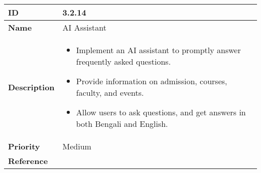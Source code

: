 \vspace{0.5cm}

\begin{center}
\begin{tabular}{ | >{\bfseries}m{5em} | m{10cm} |  } 
  \hline
  ID & 3.2.14\\  
  \hline
  Name & AI Assistant \\  
  \hline
  Description & 
  \begin{itemize}
      \item Implement an AI assistant to promptly answer frequently asked questions.
      \item Provide information on admission, courses, faculty, and events.
      \item Allow users to ask questions, and get answers in both Bengali and English.
  \end{itemize} \\ 
  \hline
  Priority & Medium\\
  \hline 
  Reference & \\
  \hline
  
\end{tabular}
\end{center}
